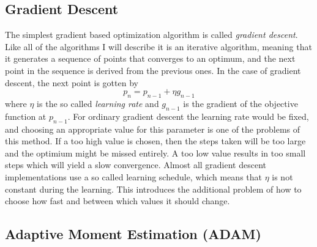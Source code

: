 \subsection{Gradient Descent}

The simplest gradient based optimization algorithm is called \emph{gradient
descent}.
Like all of the algorithms I will describe it is an iterative algorithm,
meaning that it generates a sequence of points that converges to an optimum,
and the next point in the sequence is derived from the previous ones.
In the case of gradient descent, the next point is gotten by
\begin{equation}
	p_n = p_{n-1} + \eta g_{n-1}
\end{equation}
where $\eta$ is the so called \emph{learning rate} and $g_{n-1}$ is the gradient
of the objective function at $p_{n-1}$.
For ordinary gradient descent the learning rate would be fixed,
and choosing an appropriate value for this parameter is one of the problems of
this method.
If a too high value is chosen, then the steps taken will be too large and the
optimium might be missed entirely.
A too low value results in too small steps which will yield a slow convergence.
Almost all gradient descent implementations use a so called learning schedule,
which means that $\eta$ is not constant during the learning.
This introduces the additional problem of how to choose how fast and between
which values it should change.

\subsection{Adaptive Moment Estimation (ADAM)}

